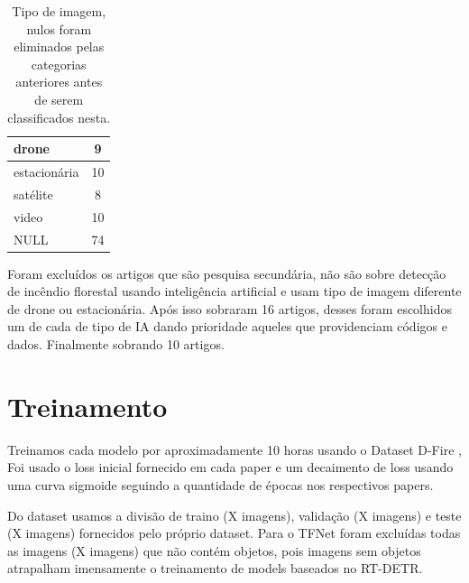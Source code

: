 \begin{table}[h]
\centering
\begin{tabular}{ |l c| }
    \hline
    drone & 9 \\
    \hline
    estacionária & 10 \\
    \hline
    satélite & 8 \\
    \hline
    video & 10 \\
    \hline
    NULL & 74 \\
    \hline
\end{tabular}
\caption{Tipo de imagem, nulos foram eliminados pelas categorias anteriores antes de serem classificados nesta.}
\label{isaboutforestfire}
\end{table}

Foram excluídos os artigos que são pesquisa secundária, não são sobre detecção de incêndio florestal usando inteligência artificial e usam tipo de imagem diferente de drone ou estacionária. Após isso sobraram 16 artigos, desses foram escolhidos um de cada de tipo de IA dando prioridade aqueles que providenciam códigos e dados. Finalmente sobrando 10 artigos.

\section{Treinamento}
Treinamos cada modelo por aproximadamente 10 horas usando o Dataset D-Fire , Foi usado o loss inicial fornecido em cada paper e um decaimento de loss usando uma curva sigmoide seguindo a quantidade de épocas nos respectivos papers.

Do dataset usamos a divisão de traino (X imagens), validação (X imagens) e teste (X imagens) fornecidos pelo próprio dataset. Para o TFNet foram excluídas todas as imagens (X imagens) que não contém objetos, pois imagens sem objetos atrapalham imensamente o treinamento de models baseados no RT-DETR.
